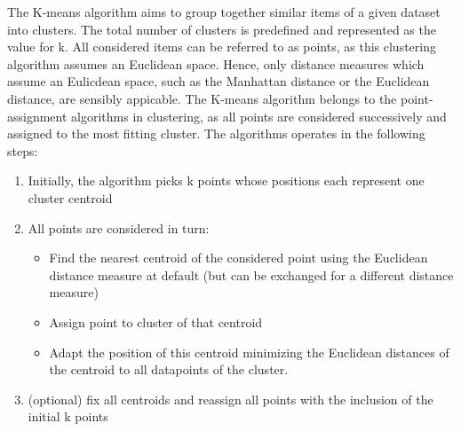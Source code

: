 The K-means algorithm aims to group together similar items of a given dataset into clusters. 
The total number of clusters is predefined and represented as the value for k. All considered items can be referred to as points, as this clustering algorithm assumes an Euclidean space. Hence, only distance measures which assume an Eulicdean space, such as the Manhattan distance or the Euclidean distance, are sensibly appicable. The K-means algorithm belongs to the point-assignment algorithms in clustering, as all points are considered successively and assigned to the most fitting cluster. The algorithms operates in the following steps: \cite{MMDS}
\begin{enumerate}
	\item Initially, the algorithm picks k points whose positions each represent one cluster centroid
	\item All points are considered in turn:
	\begin{itemize}
		\item Find the nearest centroid of the considered point  using the Euclidean distance measure at default (but can be exchanged for a different distance measure)
		\item Assign point to cluster of that centroid
		\item Adapt the position of this centroid minimizing the Euclidean distances of the centroid to all datapoints of the cluster.
	\end{itemize}	
	
	\item (optional) fix all centroids and reassign all points with the inclusion of the initial k points
	
\end{enumerate}


